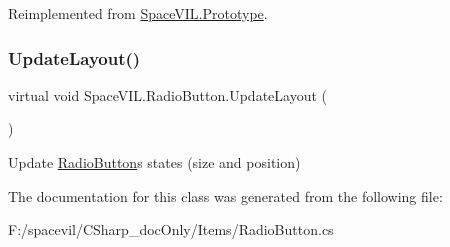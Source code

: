 Reimplemented from \mbox{\hyperlink{class_space_v_i_l_1_1_prototype}{Space\+V\+I\+L.\+Prototype}}.

\mbox{\label{class_space_v_i_l_1_1_radio_button_a899b3a81136fe60e0ad2b1aace9db40c}} 
\subsubsection{\texorpdfstring{Update\+Layout()}{UpdateLayout()}}
{\footnotesize\ttfamily virtual void Space\+V\+I\+L.\+Radio\+Button.\+Update\+Layout (\begin{DoxyParamCaption}{ }\end{DoxyParamCaption})\hspace{0.3cm}{\ttfamily [virtual]}}



Update \mbox{\hyperlink{class_space_v_i_l_1_1_radio_button}{Radio\+Button}}\textquotesingle{}s states (size and position) 



The documentation for this class was generated from the following file\+:\begin{DoxyCompactItemize}
\item 
F\+:/spacevil/\+C\+Sharp\+\_\+doc\+Only/\+Items/Radio\+Button.\+cs\end{DoxyCompactItemize}
